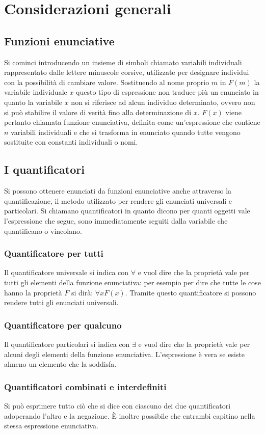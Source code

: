 \section{Considerazioni generali}
\subsection{Funzioni enunciative}
Si cominci introducendo un insieme di simboli chiamato variabili individuali rappresentato dalle lettere minuscole corsive, utilizzate per designare individui con la possibilit\`a di cambiare valore. Sostituendo al 
nome proprio $m$ in $F(m)$ la variabile individuale $x$ questo tipo di espressione non traduce pi\`u un enunciato in quanto la variabile $x$ non si riferisce ad alcun individuo determinato, ovvero non si pu\`o 
stabilire il valore di verit\`a fino alla determinazione di $x$. $F(x)$ viene pertanto chiamata funzione enunciativa, definita come un'espressione che contiene $n$ variabili individuali e che si trasforma in 
enunciato quando tutte vengono sostituite con constanti individuali o nomi.
\subsection{I quantificatori}
Si possono ottenere enunciati da funzioni enunciative anche attraverso la quantificazione, il metodo utilizzato per rendere gli enunciati universali e particolari. Si chiamano quantificatori in quanto dicono per 
quanti oggetti vale l'espressione che segue, sono immediatamente seguiti dalla variabile che quantificano o vincolano. 
\subsubsection{Quantificatore per tutti}
Il quantificatore universale si indica con $\forall$ e vuol dire che la propriet\`a vale per tutti gli elementi della funzione enunciativa: per esempio per dire che tutte le cose hanno la propriet\`a $F$ si dir\`a: $
\forall xF(x)$. Tramite questo quantificatore si possono rendere tutti gli enunciati universali.
\subsubsection{Quantificatore per qualcuno}
Il quantificatore particolari si indica con $\exists$ e vuol dire che la propriet\`a vale per alcuni degli elementi della funzione enunciativa. L'espressione \`e vera se esiste almeno un elemento che la soddisfa. 
\subsubsection{Quantificatori combinati e interdefiniti}
Si pu\`o esprimere tutto ci\`o che si dice con ciascuno dei due quantificatori adoperando l'altro e la negazione. \`E inoltre possibile che entrambi capitino nella stessa espressione enunciativa. 
